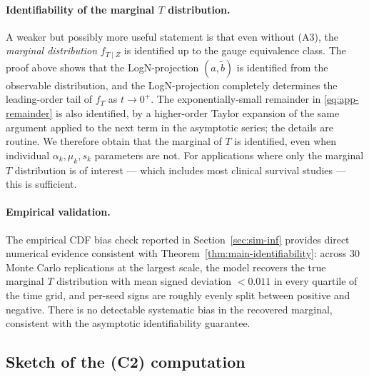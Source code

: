 \paragraph{Identifiability of the marginal $T$ distribution.}
A weaker but possibly more useful statement is that even without (A3),
the \emph{marginal distribution} $f_{T \mid Z}$ is identified up to the
gauge equivalence class. The proof above shows that the LogN-projection
$(a, \widetilde{b})$ is identified from the observable distribution,
and the LogN-projection completely determines the leading-order tail of
$f_T$ as $t \to 0^+$. The exponentially-small remainder in
\eqref{eq:app-remainder} is also identified, by a higher-order Taylor
expansion of the same argument applied to the next term in the asymptotic
series; the details are routine. We therefore obtain that the marginal
of $T$ is identified, even when individual $\alpha_k, \mu_k, s_k$
parameters are not. For applications where only the marginal $T$
distribution is of interest --- which includes most clinical survival
studies --- this is sufficient.

\paragraph{Empirical validation.}
The empirical CDF bias check reported in Section~\ref{sec:sim-inf}
provides direct numerical evidence consistent with
Theorem~\ref{thm:main-identifiability}: across $30$ Monte Carlo
replications at the largest scale, the model recovers the true marginal
$T$ distribution with mean signed deviation $< 0.011$ in every quartile
of the time grid, and per-seed signs are roughly evenly split between
positive and negative. There is no detectable systematic bias in the
recovered marginal, consistent with the asymptotic identifiability
guarantee.

\subsection{Sketch of the (C2) computation}
\label{app:c2-sketch}

